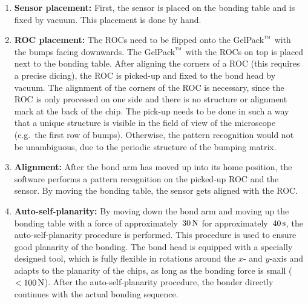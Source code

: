 \begin{enumerate}
\item \textbf{Sensor placement:} First, the sensor is placed on the bonding table and is fixed by vacuum. This placement is done by hand.
\item \textbf{\ac{ROC} placement:} The \ac{ROC}s need to be flipped onto the GelPack$\rm{\symbTM}$ with the bumps facing downwards. The GelPack$\rm{\symbTM}$ with the \ac{ROC}s on top is placed next to the bonding table. After aligning the corners of a \ac{ROC} (this requires a precise dicing), the \ac{ROC} is picked-up and fixed to the bond head by vacuum. The alignment of the corners of the \ac{ROC} is necessary, since the \ac{ROC} is only processed on one side and there is no structure or alignment mark at the back of the chip. The pick-up needs to be done in such a way that a unique structure is visible in the field of view of the microscope (e.g.~the first row of bumps). Otherwise, the pattern recognition would not be unambiguous, due to the periodic structure of the bumping matrix.
\item \textbf{Alignment:} After the bond arm has moved up into its home position, the software performs a pattern recognition on the picked-up \ac{ROC} and the sensor. By moving the bonding table, the sensor gets aligned with the \ac{ROC}.
\item \textbf{Auto-self-planarity:} By moving down the bond arm and moving up the bonding table with a force of approximately~$30\,\rm{N}$ for approximately~$40\,\rm{s}$, the auto-self-planarity procedure is performed. This procedure is used to ensure good planarity of the bonding. The bond head is equipped with a specially designed tool, which is fully flexible in rotations around the $x$- and $y$-axis and adapts to the planarity of the chips, as long as the bonding force is small ($<100\,\rm{N}$). After the auto-self-planarity procedure, the bonder directly continues with the actual bonding sequence.

\end{enumerate}
